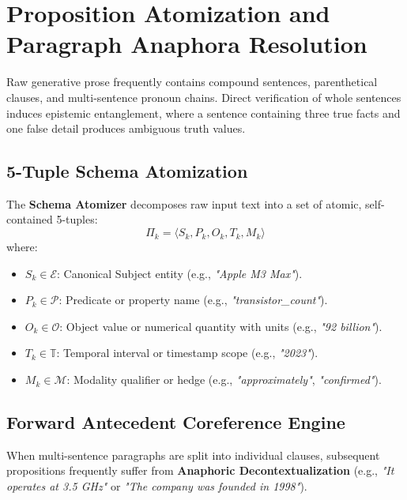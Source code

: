 \section{Proposition Atomization and Paragraph Anaphora Resolution}
\label{sec:atomization_anaphora}

Raw generative prose frequently contains compound sentences, parenthetical clauses, and multi-sentence pronoun chains. Direct verification of whole sentences induces epistemic entanglement, where a sentence containing three true facts and one false detail produces ambiguous truth values.

\subsection{5-Tuple Schema Atomization}
The \textbf{Schema Atomizer} decomposes raw input text into a set of atomic, self-contained 5-tuples:
\begin{equation}
    \Pi_k = \langle S_k, P_k, O_k, T_k, M_k \rangle
\end{equation}
where:
\begin{itemize}
    \item $S_k \in \mathcal{E}$: Canonical Subject entity (e.g., \textit{"Apple M3 Max"}).
    \item $P_k \in \mathcal{P}$: Predicate or property name (e.g., \textit{"transistor\_count"}).
    \item $O_k \in \mathcal{O}$: Object value or numerical quantity with units (e.g., \textit{"92 billion"}).
    \item $T_k \in \mathbb{T}$: Temporal interval or timestamp scope (e.g., \textit{"2023"}).
    \item $M_k \in \mathcal{M}$: Modality qualifier or hedge (e.g., \textit{"approximately"}, \textit{"confirmed"}).
\end{itemize}

\subsection{Forward Antecedent Coreference Engine}
When multi-sentence paragraphs are split into individual clauses, subsequent propositions frequently suffer from \textbf{Anaphoric Decontextualization} (e.g., \textit{"It operates at 3.5 GHz"} or \textit{"The company was founded in 1998"}). 


